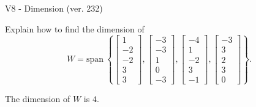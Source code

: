 \begin{exercise}
  \begin{exerciseTitle}V8 - Dimension (ver. 232)\end{exerciseTitle}
  \begin{exerciseStatement}
    Explain how to find the dimension of 
\[W=\mathrm{span}\ \left\{\left[\begin{array}{r}
1 \\
-2 \\
-2 \\
3 \\
3
\end{array}\right] , \left[\begin{array}{r}
-3 \\
-3 \\
1 \\
0 \\
-3
\end{array}\right] , \left[\begin{array}{r}
-4 \\
1 \\
-2 \\
3 \\
-1
\end{array}\right] , \left[\begin{array}{r}
-3 \\
3 \\
2 \\
3 \\
0
\end{array}\right]\right\}.\]



  \end{exerciseStatement}
  \begin{exerciseAnswer}
   The dimension of \(W\) is  \(4\).
  


  \end{exerciseAnswer}
\end{exercise}